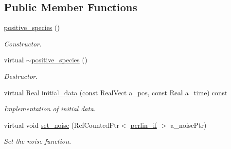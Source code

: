 \subsection*{Public Member Functions}
\begin{DoxyCompactItemize}
\item 
\hyperlink{classmorrow__lowke_1_1positive__species_ac5c05a2311260bb567baeb807f4523cd}{positive\+\_\+species} ()
\begin{DoxyCompactList}\small\item\em Constructor. \end{DoxyCompactList}\item 
virtual \hyperlink{classmorrow__lowke_1_1positive__species_a01b9f339e5ae1b9234621c49d216def1}{$\sim$positive\+\_\+species} ()
\begin{DoxyCompactList}\small\item\em Destructor. \end{DoxyCompactList}\item 
virtual Real \hyperlink{classmorrow__lowke_1_1positive__species_a507f01c203d047a8f4356db68845299e}{initial\+\_\+data} (const Real\+Vect a\+\_\+pos, const Real a\+\_\+time) const 
\begin{DoxyCompactList}\small\item\em Implementation of initial data. \end{DoxyCompactList}\item 
virtual void \hyperlink{classmorrow__lowke_1_1positive__species_a4810b0dd4cb4b407c4b17a916c182a24}{set\+\_\+noise} (Ref\+Counted\+Ptr$<$ \hyperlink{classperlin__if}{perlin\+\_\+if} $>$ a\+\_\+noise\+Ptr)
\begin{DoxyCompactList}\small\item\em Set the noise function. \end{DoxyCompactList}\end{DoxyCompactItemize}
